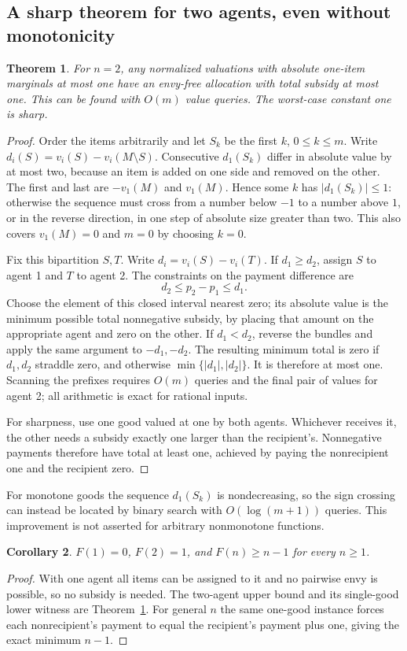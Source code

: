 \documentclass[11pt,a4paper]{article}
\newtheorem{theorem}{Theorem}[section]
\newtheorem{corollary}[theorem]{Corollary}
\theoremstyle{remark}\newtheorem{remark}[theorem]{Remark}
\begin{document}
\subsection{A sharp theorem for two agents, even without monotonicity}
\begin{theorem}\label{thm:two}
For $n=2$, any normalized valuations with absolute one-item marginals at most one have an envy-free allocation with total subsidy at most one. This can be found with $O(m)$ value queries. The worst-case constant one is sharp.
\end{theorem}
\begin{proof}
Order the items arbitrarily and let $S_k$ be the first $k$, $0\le k\le m$. Write $d_i(S)=v_i(S)-v_i(M\setminus S)$. Consecutive $d_1(S_k)$ differ in absolute value by at most two, because an item is added on one side and removed on the other. The first and last are $-v_1(M)$ and $v_1(M)$. Hence some $k$ has $|d_1(S_k)|\le1$: otherwise the sequence must cross from a number below $-1$ to a number above $1$, or in the reverse direction, in one step of absolute size greater than two. This also covers $v_1(M)=0$ and $m=0$ by choosing $k=0$.

Fix this bipartition $S,T$. Write $d_i=v_i(S)-v_i(T)$. If $d_1\ge d_2$, assign $S$ to agent 1 and $T$ to agent 2. The constraints on the payment difference are
\[
d_2\le p_2-p_1\le d_1.
\]
Choose the element of this closed interval nearest zero; its absolute value is the minimum possible total nonnegative subsidy, by placing that amount on the appropriate agent and zero on the other. If $d_1<d_2$, reverse the bundles and apply the same argument to $-d_1,-d_2$. The resulting minimum total is zero if $d_1,d_2$ straddle zero, and otherwise $\min\{|d_1|,|d_2|\}$. It is therefore at most one. Scanning the prefixes requires $O(m)$ queries and the final pair of values for agent 2; all arithmetic is exact for rational inputs.

For sharpness, use one good valued at one by both agents. Whichever receives it, the other needs a subsidy exactly one larger than the recipient's. Nonnegative payments therefore have total at least one, achieved by paying the nonrecipient one and the recipient zero.
\end{proof}
For monotone goods the sequence $d_1(S_k)$ is nondecreasing, so the sign crossing can instead be located by binary search with $O(\log(m+1))$ queries. This improvement is not asserted for arbitrary nonmonotone functions.

\begin{corollary}\label{cor:Fn}
$F(1)=0$, $F(2)=1$, and $F(n)\ge n-1$ for every $n\ge1$.
\end{corollary}
\begin{proof}
With one agent all items can be assigned to it and no pairwise envy is possible, so no subsidy is needed. The two-agent upper bound and its single-good lower witness are Theorem~\ref{thm:two}. For general $n$ the same one-good instance forces each nonrecipient's payment to equal the recipient's payment plus one, giving the exact minimum $n-1$.
\end{proof}
\end{document}
